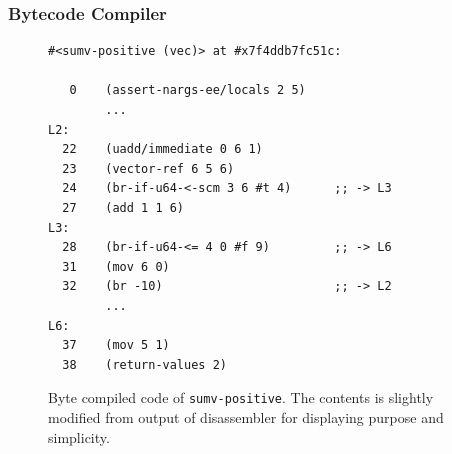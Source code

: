 \documentclass[preprint, 10pt]{sigplanconf}
\begin{document}
\subsubsection{Bytecode Compiler}

\begin{figure}
  \begin{center}
    \small
\begin{verbatim}
#<sumv-positive (vec)> at #x7f4ddb7fc51c:

   0    (assert-nargs-ee/locals 2 5)
        ...
L2:
  22    (uadd/immediate 0 6 1)
  23    (vector-ref 6 5 6)
  24    (br-if-u64-<-scm 3 6 #t 4)      ;; -> L3
  27    (add 1 1 6)
L3:
  28    (br-if-u64-<= 4 0 #f 9)         ;; -> L6
  31    (mov 6 0)
  32    (br -10)                        ;; -> L2
        ...
L6:
  37    (mov 5 1)
  38    (return-values 2)
\end{verbatim}
\end{center}
\caption{Byte compiled code of \texttt{sumv-positive}. The contents is
  slightly modified from output of disassembler for displaying purpose and
  simplicity.}
\label{fig:bytecode}
\end{figure}


\end{document}
